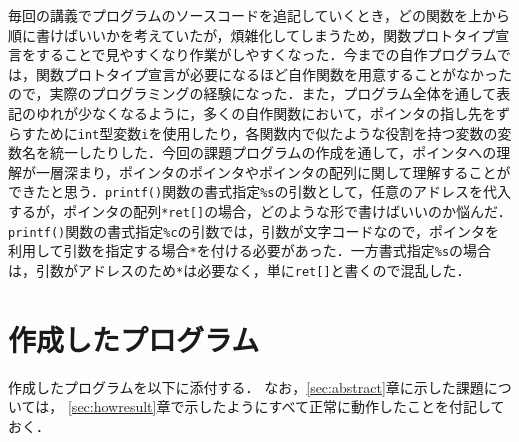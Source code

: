 毎回の講義でプログラムのソースコードを追記していくとき，どの関数を上から順に書けばいいかを考えていたが，煩雑化してしまうため，関数プロトタイプ宣言をすることで見やすくなり作業がしやすくなった\cite{book:meikai}．今までの自作プログラムでは，関数プロトタイプ宣言が必要になるほど自作関数を用意することがなかったので，実際のプログラミングの経験になった．また，プログラム全体を通して表記のゆれが少なくなるように，多くの自作関数において，ポインタの指し先をずらすために\verb|int|型変数\verb|i|を使用したり，各関数内で似たような役割を持つ変数の変数名を統一したりした．今回の課題プログラムの作成を通して，ポインタへの理解が一層深まり，ポインタのポインタやポインタの配列に関して理解することができたと思う\cite{www:label3,www:label4}．\verb|printf()|関数の書式指定\verb|%s|の引数として，任意のアドレスを代入するが，ポインタの配列\verb|*ret[]|の場合，どのような形で書けばいいのか悩んだ．\verb|printf()|関数の書式指定\verb|%c|の引数では，引数が文字コードなので，ポインタを利用して引数を指定する場合\verb|*|を付ける必要があった．一方書式指定\verb|%s|の場合は，引数がアドレスのため\verb|*|は必要なく，単に\verb|ret[]|と書くので混乱した．

\section{作成したプログラム}\label{sec:makep}

作成したプログラムを以下に添付する．
なお，\ref{sec:abstract}章に示した課題については，
\ref{sec:howresult}章で示したようにすべて正常に動作したことを付記しておく．

